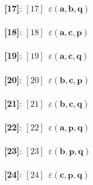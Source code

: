 \documentclass[a4paper,11pt]{article}
\newcommand{\kblbmcpggoncpf}[3]{\varepsilon(\mathbf{#1},\mathbf{#2},\mathbf{#3})}
\begin{document}
\textbf{    [17]}: $[17]\ \ \kblbmcpggoncpf{a}{b}{q}$\\\\
\textbf{    [18]}: $[18]\ \ \kblbmcpggoncpf{a}{c}{p}$\\\\
\textbf{    [19]}: $[19]\ \ \kblbmcpggoncpf{a}{c}{q}$\\\\
\textbf{    [20]}: $[20]\ \ \kblbmcpggoncpf{b}{c}{p}$\\\\
\textbf{    [21]}: $[21]\ \ \kblbmcpggoncpf{b}{c}{q}$\\\\
\textbf{    [22]}: $[22]\ \ \kblbmcpggoncpf{a}{p}{q}$\\\\
\textbf{    [23]}: $[23]\ \ \kblbmcpggoncpf{b}{p}{q}$\\\\
\textbf{    [24]}: $[24]\ \ \kblbmcpggoncpf{c}{p}{q}$\\\\
\end{document}
